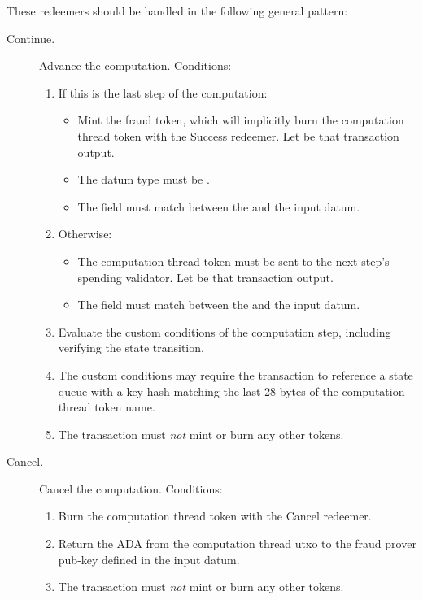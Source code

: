 \documentclass[../midgard.tex]{subfiles}
\begin{document}
These redeemers should be handled in the following general pattern:
\begin{description}
    \item[Continue.] Advance the computation. Conditions:
        \begin{enumerate}
            \item If this is the last step of the computation:
                \begin{itemize}
                    \item Mint the fraud token, which will implicitly burn the computation thread token with the Success redeemer. Let  be that transaction output.
                    \item The  datum type must be .
                    \item The  field must match between the  and the input datum.
                \end{itemize}
            \item Otherwise:
                \begin{itemize}
                    \item The computation thread token must be sent to the next step's spending validator. Let  be that transaction output.
                    \item The  field must match between the  and the input datum.
                \end{itemize}
            \item Evaluate the custom conditions of the computation step, including verifying the state transition.
            \item The custom conditions may require the transaction to reference a state queue with a key hash matching the last 28 bytes of the computation thread token name.
            \item The transaction must \emph{not} mint or burn any other tokens.
        \end{enumerate}
    \item[Cancel.] Cancel the computation. Conditions:
        \begin{enumerate}
            \item Burn the computation thread token with the Cancel redeemer.
            \item Return the ADA from the computation thread utxo to the fraud prover pub-key defined in the input datum.
            \item The transaction must \emph{not} mint or burn any other tokens.
        \end{enumerate}
\end{description}
\end{document}
